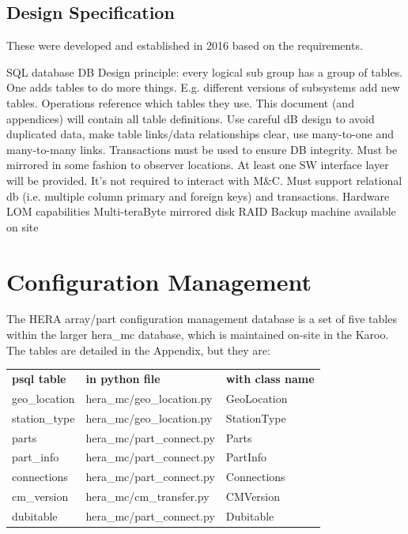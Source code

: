 \documentclass{article}
\newcommand{\mc}{M\&C}
\begin{document}
\subsection{Design Specification}
These were developed and established in 2016 based on the requirements.

\begin{outline}[enumerate]
	\1 SQL database
		\2 DB Design principle: every logical sub group has a group of tables.  One adds tables to do more things. E.g. different versions of subsystems add new tables. Operations reference which tables they use.
		\2 This document (and appendices) will contain all table definitions.
		\2 Use careful dB design to avoid duplicated data, make table links/data relationships clear, use many-to-one and many-to-many links.
		\2 Transactions must be used to ensure DB integrity.
		\2 Must be mirrored in some fashion to observer locations.
	\1 At least one SW interface layer will be provided.
		\2 It's not required to interact with \mc.
		\2 Must support relational db (i.e. multiple column primary and foreign keys) and transactions.
	\1 Hardware
		\2 LOM capabilities
		\2 Multi-teraByte mirrored disk RAID
		\2 Backup machine available on site
\end{outline}




\section{Configuration Management}
\label{sec:config}

The HERA array/part configuration management database is a set of five tables within the larger hera\_mc database, which is maintained on-site in the Karoo.  The tables are detailed in the Appendix, 
but they are: 

\begin{center}
\begin{tabular}{l l l}
         {\bf psql table} & {\bf in python file}  &  {\bf with class name} \\
	geo\_location 	& hera\_mc/geo\_location.py & GeoLocation \\
	station\_type 	& hera\_mc/geo\_location.py & StationType \\
	parts 	& hera\_mc/part\_connect.py & Parts \\
	part\_info 	         & hera\_mc/part\_connect.py & PartInfo \\
	connections 	& hera\_mc/part\_connect.py & Connections \\
	cm\_version      & hera\_mc/cm\_transfer.py & CMVersion\\
	dubitable          & hera\_mc/part\_connect.py & Dubitable\\
\end{tabular}
\end{center}
\end{document}
